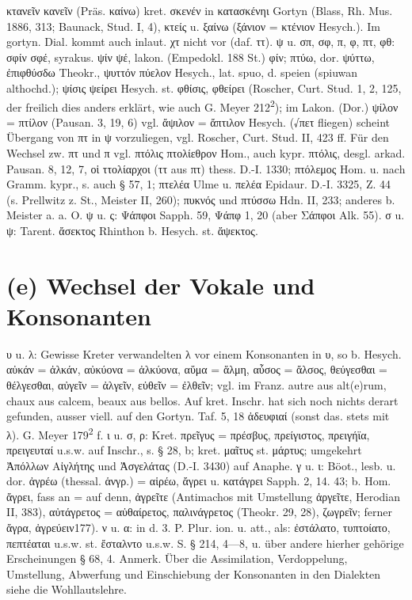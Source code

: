 κτανεῖν κανεῖν (Präs. καίνω) kret. σκενέν in κατασκένηι Gortyn (Blass, Rh. Mus. 1886, 313; Baunack, Stud. I, 4), κτείς u. ξαίνω (ξάνιον = κτένιον Hesych.). Im gortyn. Dial. kommt auch inlaut. χτ nicht vor (daf. ττ). ψ u. σπ, σφ, π, φ, πτ, φθ: σφίν σφέ, syrakus. ψίν ψέ, lakon. (Empedokl. 188 St.) φίν; πτύω, dor. ψύττω, ἐπιφθύσδω Theokr., ψυττόν πύελον Hesych., lat. spuo, d. speien (spiuwan althochd.); ψίσις ψείρει Hesych. st. φθίσις, φθείρει (Roscher, Curt. Stud. 1, 2, 125, der freilich dies anders erklärt, wie auch G. Meyer 212\textsuperscript{2}); im Lakon. (Dor.) ψίλον = πτίλον (Pausan. 3, 19, 6) vgl. ἄψιλον = ἄπτιλον Hesych. (√πετ fliegen) scheint Übergang von πτ in ψ vorzuliegen, vgl. Roscher, Curt. Stud. II, 423 ff. Für den Wechsel zw. πτ und π vgl. πτόλις πτολίεθρον Hom., auch kypr. πτόλις, desgl. arkad. Pausan. 8, 12, 7, οἱ ττολίαρχοι (ττ aus πτ) thess. D.-I. 1330; πτόλεμος Hom. u. nach Gramm. kypr., s. auch § 57, 1; πτελέα Ulme u. πελέα Epidaur. D.-I. 3325, Z. 44 (s. Prellwitz z. St., Meister II, 260); πυκνός und πτύσσω Hdn. II, 233; anderes b. Meister a. a. O. ψ u. ς: Ψάπφοι Sapph. 59, Ψάπφ 1, 20 (aber Σάπφοι Alk. 55). σ u. ψ: Tarent. ἄσεκτος Rhinthon b. Hesych. st. ἄψεκτος.
\section{(e) Wechsel der Vokale und Konsonanten}

υ u. λ: Gewisse Kreter verwandelten λ vor einem Konsonanten in υ, so b. Hesych. αὐκάν = ἀλκάν, αὐκύονα = ἀλκύονα, αὕμα = ἅλμη, αὖσος = ἄλσος, θεύγεσθαι = θέλγεσθαι, αὐγεῖν = ἀλγεῖν, εὐθεῖν = ἐλθεῖν; vgl. im Franz. autre aus alt(e)rum, chaux aus calcem, beaux aus bellos. Auf kret. Inschr. hat sich noch nichts derart gefunden, ausser viell. auf den Gortyn. Taf. 5, 18 ἀδευφιαί (sonst das. stets mit λ). G. Meyer 179\textsuperscript{2} f. ι u. σ, ρ: Kret. πρεῖγυς = πρέσβυς, πρείγιστος, πρειγήϊα, πρειγευταί u.s.w. auf Inschr., s. § 28, b; kret. μαῖτυς st. μάρτυς; umgekehrt Ἀπόλλων Αἰγλήτης und Ἀσγελάτας (D.-I. 3430) auf Anaphe. γ u. ι: Böot., lesb. u. dor. ἀγρέω (thessal. ἁνγρ.) = αἱρέω, ἄγρει u. κατάγρει Sapph. 2, 14. 43; b. Hom. ἄγρει, fass an = auf denn, ἀγρεῖτε (Antimachos mit Umstellung ἀργεῖτε, Herodian II, 383), αὐτάγρετος = αὐθαίρετος, παλινάγρετος (Theokr. 29, 28), ζωγρεῖν; ferner ἄγρα, ἀγρεύειν177). ν u. α: in d. 3. P. Plur. ion. u. att., als: ἐστάλατο, τυπτοίατο, πεπτέαται u.s.w. st. ἔσταλντο u.s.w. S. § 214, 4—8, u. über andere hierher gehörige Erscheinungen § 68, 4. Anmerk. Über die Assimilation, Verdoppelung, Umstellung, Abwerfung und Einschiebung der Konsonanten in den Dialekten siehe die Wohllautslehre.
